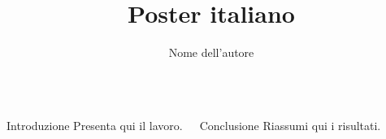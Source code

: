 \documentclass{beamer}
\title{Poster italiano}
\author{Nome dell'autore}
\begin{document}
\begin{frame}
\begin{columns}[t]
  \begin{block}{Introduzione}
    Presenta qui il lavoro.
  \end{block}
  \begin{block}{Conclusione}
    Riassumi qui i risultati.
  \end{block}
\end{columns}
\end{frame}
\end{document}
